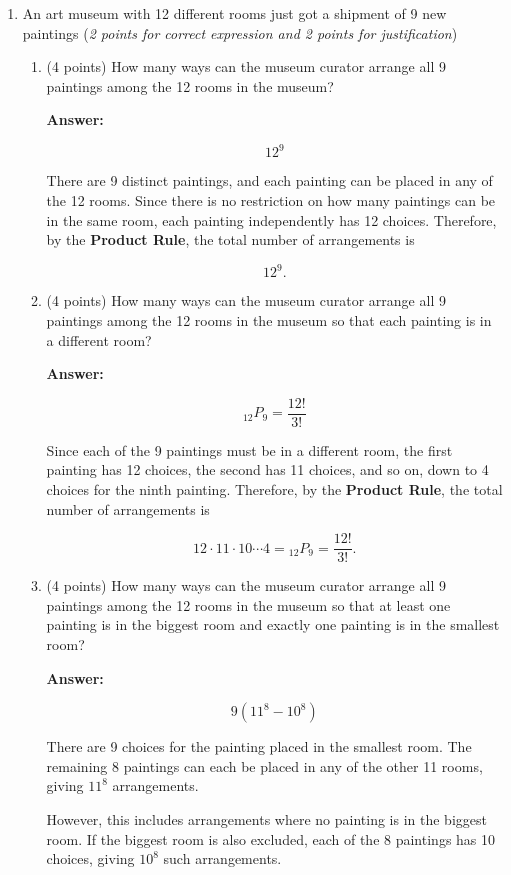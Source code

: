 \documentclass[10pt,letterpaper,unboxed,cm]{article}
\begin{document}
\begin{enumerate}
\begin{enumerate}
\[
\boxed{\binom{26}{7}}.
\]

\end{enumerate}

\item
An art museum with 12 different rooms just got a shipment of 9 new paintings (\emph{2 points for correct expression and 2 points for justification})
\begin{enumerate}
\item
(4 points)
How many ways can the museum curator arrange all 9 paintings among the 12 rooms in the museum?

\textbf{Answer:}

\[
12^9
\]

There are 9 distinct paintings, and each painting can be placed in any
of the 12 rooms. Since there is no restriction on how many paintings
can be in the same room, each painting independently has 12 choices.
Therefore, by the \textbf{Product Rule}, the total number of
arrangements is

\[
\boxed{12^9}.
\]

\item
(4 points)
How many ways can the museum curator arrange all 9 paintings among the 12 rooms in the museum so that each painting is in a different room?

\textbf{Answer:}

\[
{}_{12}P_9=\frac{12!}{3!}
\]

Since each of the 9 paintings must be in a different room, the first
painting has 12 choices, the second has 11 choices, and so on, down to
4 choices for the ninth painting.
Therefore, by the \textbf{Product Rule}, the total number of
arrangements is

\[
\boxed{12\cdot11\cdot10\cdots4
= {}_{12}P_9
= \frac{12!}{3!}}.
\]

\item
(4 points)
How many ways can the museum curator arrange all 9 paintings among the 12 rooms in the museum so that at least one painting is in the biggest room and exactly one painting is in the smallest room?

\textbf{Answer:}

\[
9(11^8-10^8)
\]

There are 9 choices for the painting placed in the smallest room.
The remaining 8 paintings can each be placed in any of the other
11 rooms, giving $11^8$ arrangements.

However, this includes arrangements where no painting is in the biggest
room. If the biggest room is also excluded, each of the 8 paintings has
10 choices, giving $10^8$ such arrangements.


\end{enumerate}
\end{enumerate}
\end{document}
